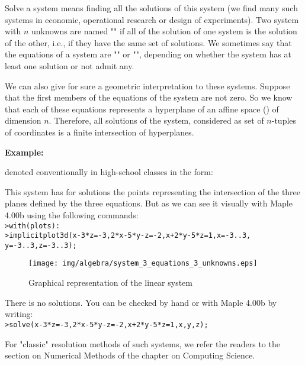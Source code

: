 Solve a system means finding all the solutions of this system (we find many such systems in economic, operational research or design of experiments). Two system with $n$ unknowns are named  "" if all of the solution of one system is the solution of the other, i.e., if they have the same set of solutions. We sometimes say that the equations of a system are "" or "", depending on whether the system has at least one solution or not admit any.

We can also give for sure a geometric interpretation to these systems. Suppose that the first members of the equations of the system are not zero. So we know that each of these equations represents a hyperplane of an affine space () of dimension $n$. Therefore, all solutions of the system, considered as set of $n$-tuples of coordinates is a finite intersection of hyperplanes.

	\begin{tcolorbox}[colframe=black,colback=white,sharp corners]
	\textbf{{\Large {}}Example:}
	
	denoted conventionally in high-school classes in the form:
	
	This system has for solutions the points representing the intersection of the three planes defined by the three equations. But as we can see it visually with Maple 4.00b using the following commands:\\

	\texttt{>with(plots):}\\
	\texttt{>implicitplot3d({x-3*z=-3,2*x-5*y-z=-2,x+2*y-5*z=1},x=-3..3,}
	\texttt{y=-3..3,z=-3..3);}
	
	\begin{figure}[H]
	\centering
	\texttt{[image: img/algebra/system\_3\_equations\_3\_unknowns.eps]}
	\caption{Graphical representation of the linear system}
	\end{figure}
	
	There is no solutions. You can be checked by hand or with Maple 4.00b by writing:\\
	
	\texttt{>solve({x-3*z=-3,2*x-5*y-z=-2,x+2*y-5*z=1},{x,y,z});}
	\end{tcolorbox}

	\begin{tcolorbox}[title=Remark,colframe=black,arc=10pt]
For "classic" resolution methods of such systems, we refer the readers to the section on Numerical Methods of the chapter on Computing Science.
	\end{tcolorbox}	
	

